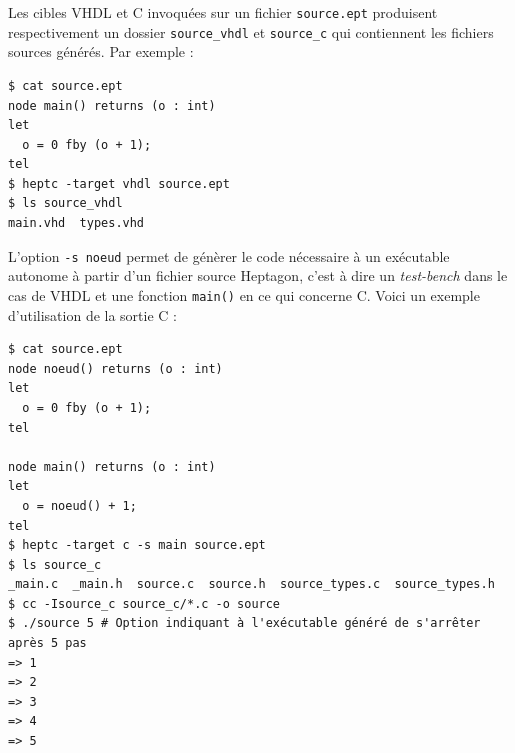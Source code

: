 \documentclass[9pt,a4paper]{article}
\newcommand{\LANG}{Heptagon}
\begin{document}
Les cibles VHDL et C invoquées sur un fichier \verb/source.ept/ produisent
respectivement un dossier \verb/source_vhdl/ et \verb/source_c/ qui contiennent
les fichiers sources générés. Par exemple :

\begin{verbatim}
$ cat source.ept
node main() returns (o : int)
let
  o = 0 fby (o + 1);
tel
$ heptc -target vhdl source.ept
$ ls source_vhdl
main.vhd  types.vhd
\end{verbatim}

L'option \verb/-s noeud/ permet de génèrer le code nécessaire à un exécutable
autonome à partir d'un fichier source \LANG{}, c'est à dire un
\textit{test-bench} dans le cas de VHDL et une fonction \verb/main()/ en ce qui
concerne C. Voici un exemple d'utilisation de la sortie C :

\begin{verbatim}
$ cat source.ept
node noeud() returns (o : int)
let
  o = 0 fby (o + 1);
tel

node main() returns (o : int)
let
  o = noeud() + 1;
tel
$ heptc -target c -s main source.ept
$ ls source_c
_main.c  _main.h  source.c  source.h  source_types.c  source_types.h
$ cc -Isource_c source_c/*.c -o source
$ ./source 5 # Option indiquant à l'exécutable généré de s'arrêter après 5 pas
=> 1
=> 2
=> 3
=> 4
=> 5
\end{verbatim}



\end{document}
